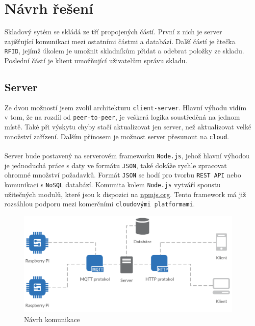 \documentclass[czech,BP]{thesiskiv}
\begin{document}
	
	
	
	
	
	
	
	
	
\chapter{Návrh řešení}

Skladový sytém se skládá ze tří propojených částí. 
První z nich je server zajišťující komunikaci mezi ostatními částmi a databází.  
Další částí je čtečka \texttt{RFID}, jejímž úkolem je umožnit skladníkům přidat a odebrat položky ze skladu.  
Poslední částí je klient umožňující uživatelům správu skladu.

		\section{Server} 
			Ze dvou možností jsem zvolil architekturu \texttt{client-server}. Hlavní výhodu vidím v tom, že na rozdíl od \texttt{peer-to-peer}, je veškerá logika soustředěná na jednom místě. Také při výskytu chyby stačí aktualizovat jen server, než aktualizovat velké množství zařízení.
			Dalším přínosem je možnost server přesunout na \texttt{cloud}.
			\\\\
			Server bude postavený na serverovém frameworku \texttt{Node.js}, jehož hlavní výhodou je jednoduchá práce s daty ve formátu \texttt{JSON}, také dokáže rychle zpracovat ohromné množství požadavků.
	Formát \texttt{JSON} se hodí pro tvorbu \texttt{REST API} nebo komunikaci s \texttt{NoSQL} databází. 
	Komunita kolem \texttt{Node.js} vytváří spoustu užitečných modulů, které jsou k dispozici na \url{npmjs.org}. Tento framework má již rozsáhlou podporu mezi komerčními \texttt{cloudovými platformami}.
				
		
		\begin{figure}[H]
   		 	\centering
			\includegraphics[width=1\textwidth]{../diagrams/network.png}	
			\caption{Návrh komunikace}
    		\label{fig:network}
		\end{figure}
		
\end{document}
